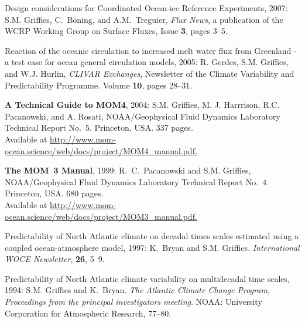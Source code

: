 \begin{etaremune}
\item Design considerations for Coordinated Ocean-ice Reference Experiments, 2007: S.M. Grif\/f\/ies, C.\ B\"oning, and A.M.\ Treguier, {\em Flux News}, a publication of the WCRP Working Group on Surface Fluxes, Issue {\bf 3}, pages 3--5.

\item Reaction of the oceanic circulation to increased melt water flux from Greenland - a test case for ocean general circulation models, 2005: R. Gerdes, S.M. Grif\/f\/ies, and W.J. Hurlin, {\em CLIVAR Exchanges}, Newsletter of the Climate Variability and Predictability Programme.  Volume {\bf 10}, pages 28--31.

\item {\bf A Technical Guide to MOM4}, 2004: S.M. Grif\/f\/ies, M. J. Harrrison, R.C. Pacanowski, and A. Rosati, NOAA/Geophysical Fluid Dynamics Laboratory Technical Report No.\ 5. Princeton, USA. 337 pages.  \\
Available at  \href{http://www.mom-ocean.science/web/docs/project/MOM4_manual.pdf}{http://www.mom-ocean.science/web/docs/project/MOM4\_manual.pdf.}

\item {\bf The MOM~3 Manual}, 1999: R.\ C.\ Pacanowski and S.M. Grif\/f\/ies,  NOAA/Geophysical Fluid Dynamics Laboratory Technical Report No.\ 4. Princeton, USA.  680 pages.  \\ Available at
\href{http://www.mom-ocean.science/web/docs/project/MOM3_manual.pdf}{http://www.mom-ocean.science/web/docs/project/MOM3\_manual.pdf.}
  
\item Predictability of North Atlantic climate on decadal times scales estimated using a coupled ocean-atmosphere model, 1997: K.\ Bryan and S.M. Grif\/f\/ies.  {\em International WOCE Newsletter}, {\bf 26}, 5--9.

\item Predictability of North Atlantic climate variability on multidecadal time scales, 1994: S.M. Grif\/f\/ies and K.\ Bryan.  {\em The Atlantic Climate Change Program, Proceedings from the principal investigators meeting}.  NOAA: University Corporation for Atmospheric Research, 77--80.

\end{etaremune}

